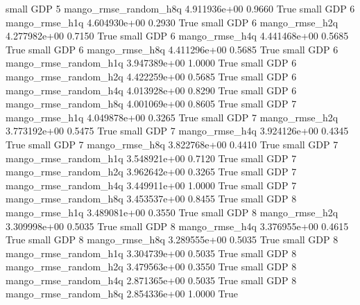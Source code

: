      small      GDP                 5 mango_rmse_random_h8q 4.911936e+00      0.9660    True
     small      GDP                 6        mango_rmse_h1q 4.604930e+00      0.2930    True
     small      GDP                 6        mango_rmse_h2q 4.277982e+00      0.7150    True
     small      GDP                 6        mango_rmse_h4q 4.441468e+00      0.5685    True
     small      GDP                 6        mango_rmse_h8q 4.411296e+00      0.5685    True
     small      GDP                 6 mango_rmse_random_h1q 3.947389e+00      1.0000    True
     small      GDP                 6 mango_rmse_random_h2q 4.422259e+00      0.5685    True
     small      GDP                 6 mango_rmse_random_h4q 4.013928e+00      0.8290    True
     small      GDP                 6 mango_rmse_random_h8q 4.001069e+00      0.8605    True
     small      GDP                 7        mango_rmse_h1q 4.049878e+00      0.3265    True
     small      GDP                 7        mango_rmse_h2q 3.773192e+00      0.5475    True
     small      GDP                 7        mango_rmse_h4q 3.924126e+00      0.4345    True
     small      GDP                 7        mango_rmse_h8q 3.822768e+00      0.4410    True
     small      GDP                 7 mango_rmse_random_h1q 3.548921e+00      0.7120    True
     small      GDP                 7 mango_rmse_random_h2q 3.962642e+00      0.3265    True
     small      GDP                 7 mango_rmse_random_h4q 3.449911e+00      1.0000    True
     small      GDP                 7 mango_rmse_random_h8q 3.453537e+00      0.8455    True
     small      GDP                 8        mango_rmse_h1q 3.489081e+00      0.3550    True
     small      GDP                 8        mango_rmse_h2q 3.309998e+00      0.5035    True
     small      GDP                 8        mango_rmse_h4q 3.376955e+00      0.4615    True
     small      GDP                 8        mango_rmse_h8q 3.289555e+00      0.5035    True
     small      GDP                 8 mango_rmse_random_h1q 3.304739e+00      0.5035    True
     small      GDP                 8 mango_rmse_random_h2q 3.479563e+00      0.3550    True
     small      GDP                 8 mango_rmse_random_h4q 2.871365e+00      0.5035    True
     small      GDP                 8 mango_rmse_random_h8q 2.854336e+00      1.0000    True